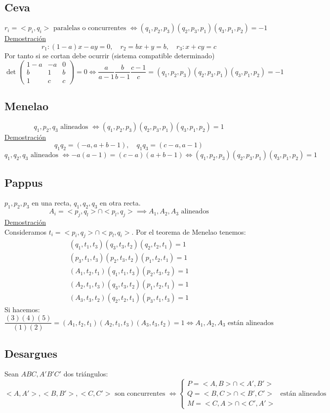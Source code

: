 \documentclass{article}
\newcommand{\h}{\hspace{1em}}
\renewcommand{\t}[1]{\text{#1}}
\begin{document}
\subsection{Ceva}
\[r_i = <p_i, q_i> \t{ paralelas o concurrentes }\iff (q_1, p_2, p_3)(q_2, p_3, p_1)(q_3, p_1, p_2) = -1\]
\underline{Demostración}
\[r_1:(1-a)x-ay=0, \h r_2 = bx+y=b, \h r_3:x+cy=c\]
Por tanto si se cortan debe ocurrir (sistema compatible determinado)
\[\det\begin{pmatrix}
    1-a & -a & 0\\
    b & 1 & b\\
    1 & c & c
\end{pmatrix}=0 \iff \frac{a}{a-1}\frac{b}{b-1}\frac{c-1}{c}=(q_1, p_2, p_3)(q_2, p_3, p_1)(q_3, p_1, p_2) = -1\]
\subsection{Menelao}
\[q_1, p_2, q_3 \t{ alineados }\iff (q_1, p_2, p_3)(q_2, p_3, p_1)(q_3, p_1, p_2) = 1\]
\underline{Demostración}
\[q_1q_2=(-a,a+b-1), \h q_1q_3=(c-a,a-1)\]
\[q_1, q_2, q_3 \t{ alineados } \iff -a(a-1)=(c-a)( a+b-1) \iff (q_1, p_2, p_3)(q_2, p_3, p_1)(q_3, p_1, p_2) = 1\]

\subsection{Pappus}
$p_1, p_2, p_3$ en una recta, $q_1, q_2, q_3$ en otra recta.
\[A_i=<p_j, q_l>\cap <p_l, q_j> \implies A_1, A_2, A_3 \t{ alineados}\]
\underline{Demostración} \\
Consideramos $t_i=<p_i, q_j>\cap<p_l, q_i>$. Por el teorema de Menelao tenemos:
\begin{align}
    (q_1, t_1, t_3)(q_3, t_3, t_2)(q_2, t_2, t_1)=1 \\
    (p_3, t_1, t_3)(p_2, t_3, t_2)(p_1, t_2, t_1)=1 \\
    (A_1, t_2, t_1)(q_1, t_1, t_3)(p_2, t_3, t_2)=1 \\
    (A_2, t_1, t_3)(q_3, t_3, t_2)(p_1, t_2, t_1)=1 \\
    (A_3, t_3, t_2)(q_2, t_2, t_1)(p_3, t_1, t_3)=1
\end{align}
Si hacemos:
\[\frac{(3)(4)(5)}{(1)(2)}=(A_1, t_2,t_1 )(A_2, t_1,t_3 )(A_3, t_3,t_2 )=1 \iff A_1, A_2, A_3 \t{ están alineados}\]
\subsection{Desargues}
Sean $ABC, A'B'C'$ dos triángulos:
\[<A,A'>, <B, B'>, <C, C'> \t{ son concurrentes } \iff \begin{cases}
    P = <A, B>\cap<A',B'> \\
    Q = <B, C>\cap<B',C'> \\
    M = <C, A>\cap<C',A'>
\end{cases} \t{ están alineados}\]
\end{document}
